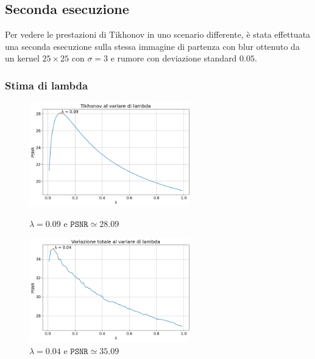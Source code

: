 \documentclass[11pt]{article}
\begin{document}
\subsection{Seconda esecuzione}
Per vedere le prestazioni di Tikhonov in uno scenario differente, è stata effettuata una seconda esecuzione sulla stessa immagine di partenza con blur ottenuto da un kernel $25 \times 25$ con $\sigma=3$ e rumore con deviazione standard $0.05$.

\subsubsection{Stima di lambda}
\begin{figure}[H]
    \centering
    \begin{minipage}{0.45\textwidth}
        \centering
        \includegraphics[width=7cm]{esecuzione/2/tikhonov_lambda.png}
        \caption{$\lambda=0.09$ e $\texttt{PSNR} \simeq 28.09$}
        \label{fig:tikhonov_lambda2}
    \end{minipage}\hfill
    \begin{minipage}{0.45\textwidth}
        \centering
        \includegraphics[width=7cm]{esecuzione/2/tv_lambda.png}
        \caption{$\lambda=0.04$ e $\texttt{PSNR} \simeq 35.09$}
        \label{fig:tv_lambda2}
    \end{minipage}
\end{figure}
\end{document}
